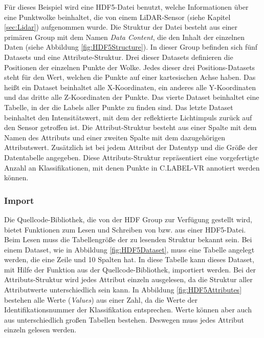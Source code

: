 Für dieses Beispiel wird eine HDF5-Datei benutzt, welche Informationen über eine Punktwolke beinhaltet, die von einem LiDAR-Sensor (siehe Kapitel \ref{sec:Lidar}) aufgenommen wurde. Die Struktur der Datei besteht aus einer primären Group mit dem Namen \textit{Data Content}, die den Inhalt der einzelnen Daten (siehe Abbildung \ref{fig:HDF5Structure}). In dieser Group befinden sich fünf Datasets und eine Attribute-Struktur. Drei dieser Datasets definieren die Positionen der einzelnen Punkte der Wolke. Jedes dieser drei Positions-Datasets steht für den Wert, welchen die Punkte auf einer kartesischen Achse haben. Das heißt ein Dataset beinhaltet alle X-Koordinaten, ein anderes alle Y-Koordinaten und das dritte alle Z-Koordinaten der Punkte. Das vierte Dataset beinhaltet eine Tabelle, in der die Labels aller Punkte zu finden sind. Das letzte Dataset beinhaltet den Intensitätswert, mit dem der reflektierte Lichtimpuls zurück auf den Sensor getroffen ist. Die Attribut-Struktur besteht aus einer Spalte mit dem Namen des Attributs und einer zweiten Spalte mit dem dazugehörigen Attributswert. Zusätzlich ist bei jedem Attribut der Datentyp und die Größe der Datentabelle angegeben. Diese Attributs-Struktur repräsentiert eine vorgefertigte Anzahl an Klassifikationen, mit denen Punkte in C.LABEL-VR annotiert werden können.\\

\subsubsection{Import}

Die Quellcode-Bibliothek, die von der HDF Group zur Verfügung gestellt wird, bietet Funktionen zum Lesen und Schreiben von bzw. aus einer HDF5-Datei. Beim Lesen muss die Tabellengröße der zu lesenden Struktur bekannt sein. Bei einem Dataset, wie in Abbildung \ref{fig:HDF5Dataset}, muss eine Tabelle angelegt werden, die eine Zeile und 10 Spalten hat. In diese Tabelle kann dieses Dataset, mit Hilfe der Funktion aus der Quellcode-Bibliothek, importiert werden. Bei der Attributs-Struktur wird jedes Attribut einzeln ausgelesen, da die Struktur aller Attributwerte unterschiedlich sein kann. In Abbildung \ref{fig:HDF5Attributes} bestehen alle Werte (\textit{Values}) aus einer Zahl, da die Werte der Identifikationsnummer der Klassifikation entsprechen. Werte können aber auch aus unterschiedlich großen Tabellen bestehen. Deswegen muss jedes Attribut einzeln gelesen werden.\\

